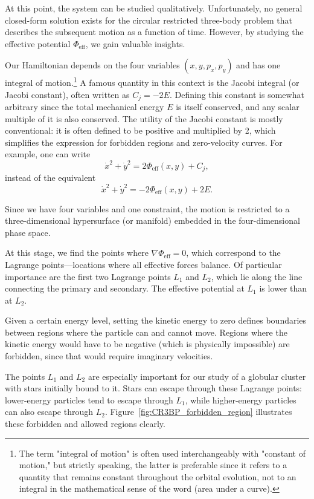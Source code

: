         At this point, the system can be studied qualitatively. Unfortunately, no general closed-form solution exists for the circular restricted three-body problem that describes the subsequent motion as a function of time. However, by studying the effective potential \(\Phi_\mathrm{eff}\), we gain valuable insights.

        Our Hamiltonian depends on the four variables \((x, y, p_x, p_y)\) and has one integral of motion.\footnote{The term "integral of motion" is often used interchangeably with "constant of motion," but strictly speaking, the latter is preferable since it refers to a quantity that remains constant throughout the orbital evolution, not to an integral in the mathematical sense of the word (area under a curve).} A famous quantity in this context is the Jacobi integral (or Jacobi constant), often written as \(C_j = -2E\). Defining this constant is somewhat arbitrary since the total mechanical energy \(E\) is itself conserved, and any scalar multiple of it is also conserved. The utility of the Jacobi constant is mostly conventional: it is often defined to be positive and multiplied by 2, which simplifies the expression for forbidden regions and zero-velocity curves. For example, one can write
        \[
        \dot{x}^2 + \dot{y}^2 = 2 \Phi_\mathrm{eff}(x,y) + C_j,
        \]
        instead of the equivalent
        \[
        \dot{x}^2 + \dot{y}^2 = -2 \Phi_\mathrm{eff}(x,y) + 2E.
        \]
        

        Since we have four variables and one constraint, the motion is restricted to a three-dimensional hypersurface (or manifold) embedded in the four-dimensional phase space.

        At this stage, we find the points where \(\nabla \Phi_\mathrm{eff} = 0\), which correspond to the Lagrange points—locations where all effective forces balance. Of particular importance are the first two Lagrange points \(L_1\) and \(L_2\), which lie along the line connecting the primary and secondary. The effective potential at \(L_1\) is lower than at \(L_2\).

        Given a certain energy level, setting the kinetic energy to zero defines boundaries between regions where the particle can and cannot move. Regions where the kinetic energy would have to be negative (which is physically impossible) are forbidden, since that would require imaginary velocities.

        The points \(L_1\) and \(L_2\) are especially important for our study of a globular cluster with stars initially bound to it. Stars can escape through these Lagrange points: lower-energy particles tend to escape through \(L_1\), while higher-energy particles can also escape through \(L_2\). Figure~\ref{fig:CR3BP_forbidden_region} illustrates these forbidden and allowed regions clearly.




